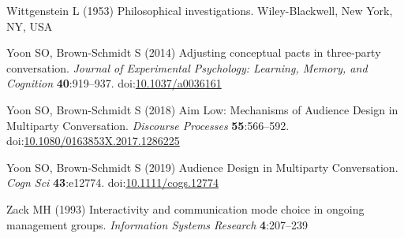 \documentclass[
  english,
  a4paper,
]{article}
\newlength{\cslhangindent}
\newlength{\cslentryspacingunit} %
\newenvironment{CSLReferences}[2] %
 {%
  \setlength{\parindent}{0pt}
  \ifodd #1
  \let\oldpar\par
  \def\par{\hangindent=\cslhangindent\oldpar}
  \fi
  \setlength{\parskip}{#2\cslentryspacingunit}
 }%
 {}
\begin{document}
\begin{CSLReferences}{1}{0}
\leavevmode{}%
Wittgenstein L (1953) Philosophical investigations. Wiley-Blackwell, New York, NY, USA

\leavevmode{}%
Yoon SO, Brown-Schmidt S (2014) Adjusting conceptual pacts in three-party conversation. \emph{Journal of Experimental Psychology: Learning, Memory, and Cognition} \textbf{40}:919--937. doi:\href{https://doi.org/10.1037/a0036161}{10.1037/a0036161}

\leavevmode{}%
Yoon SO, Brown-Schmidt S (2018) Aim {Low}: {Mechanisms} of {Audience Design} in {Multiparty Conversation}. \emph{Discourse Processes} \textbf{55}:566--592. doi:\href{https://doi.org/10.1080/0163853X.2017.1286225}{10.1080/0163853X.2017.1286225}

\leavevmode{}%
Yoon SO, Brown‐Schmidt S (2019) Audience {Design} in {Multiparty Conversation}. \emph{Cogn Sci} \textbf{43}:e12774. doi:\href{https://doi.org/10.1111/cogs.12774}{10.1111/cogs.12774}

\leavevmode{}%
Zack MH (1993) Interactivity and communication mode choice in ongoing management groups. \emph{Information Systems Research} \textbf{4}:207--239

\end{CSLReferences}
\end{document}
